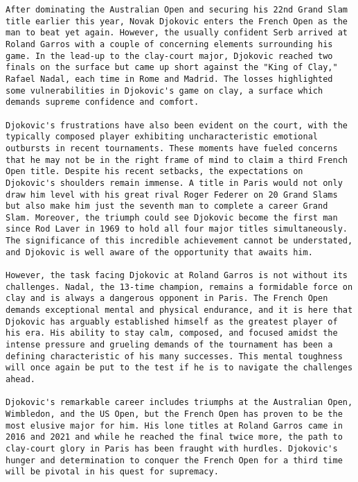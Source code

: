 \begin{lstlisting}
After dominating the Australian Open and securing his 22nd Grand Slam title earlier this year, Novak Djokovic enters the French Open as the man to beat yet again. However, the usually confident Serb arrived at Roland Garros with a couple of concerning elements surrounding his game. In the lead-up to the clay-court major, Djokovic reached two finals on the surface but came up short against the "King of Clay," Rafael Nadal, each time in Rome and Madrid. The losses highlighted some vulnerabilities in Djokovic's game on clay, a surface which demands supreme confidence and comfort.

Djokovic's frustrations have also been evident on the court, with the typically composed player exhibiting uncharacteristic emotional outbursts in recent tournaments. These moments have fueled concerns that he may not be in the right frame of mind to claim a third French Open title. Despite his recent setbacks, the expectations on Djokovic's shoulders remain immense. A title in Paris would not only draw him level with his great rival Roger Federer on 20 Grand Slams but also make him just the seventh man to complete a career Grand Slam. Moreover, the triumph could see Djokovic become the first man since Rod Laver in 1969 to hold all four major titles simultaneously. The significance of this incredible achievement cannot be understated, and Djokovic is well aware of the opportunity that awaits him.

However, the task facing Djokovic at Roland Garros is not without its challenges. Nadal, the 13-time champion, remains a formidable force on clay and is always a dangerous opponent in Paris. The French Open demands exceptional mental and physical endurance, and it is here that Djokovic has arguably established himself as the greatest player of his era. His ability to stay calm, composed, and focused amidst the intense pressure and grueling demands of the tournament has been a defining characteristic of his many successes. This mental toughness will once again be put to the test if he is to navigate the challenges ahead.

Djokovic's remarkable career includes triumphs at the Australian Open, Wimbledon, and the US Open, but the French Open has proven to be the most elusive major for him. His lone titles at Roland Garros came in 2016 and 2021 and while he reached the final twice more, the path to clay-court glory in Paris has been fraught with hurdles. Djokovic's hunger and determination to conquer the French Open for a third time will be pivotal in his quest for supremacy.


\end{lstlisting}
